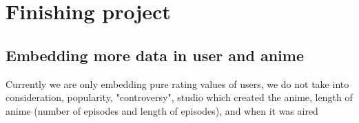 \documentclass[12pt]{article}
\begin{document}
\section{Finishing project}
\subsection{Embedding more data in user and anime}
Currently we are only embedding pure rating values of users, we do not take into consideration, popularity, "controversy", studio which created the anime, length of anime (number of episodes and length of episodes), and when it was aired \\ 
\end{document}
